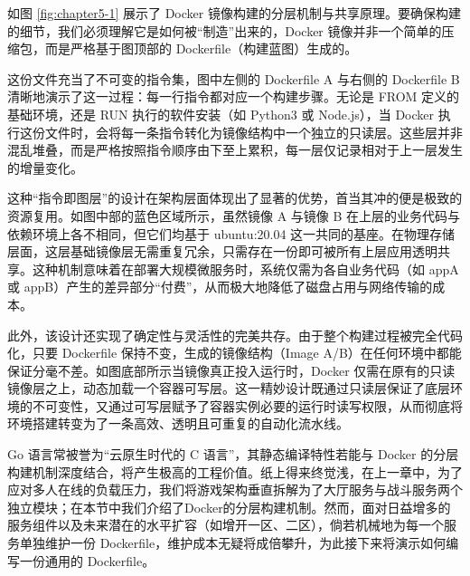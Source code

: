 如图 \ref{fig:chapter5-1} 展示了 Docker 镜像构建的分层机制与共享原理。要确保构建的细节，我们必须理解它是如何被“制造”出来的，Docker 镜像并非一个简单的压缩包，而是严格基于图顶部的 Dockerfile（构建蓝图）生成的。

这份文件充当了不可变的指令集，图中左侧的 Dockerfile A 与右侧的 Dockerfile B 清晰地演示了这一过程：每一行指令都对应一个构建步骤。无论是 FROM 定义的基础环境，还是 RUN 执行的软件安装（如 Python3 或 Node.js），当 Docker 执行这份文件时，会将每一条指令转化为镜像结构中一个独立的只读层。这些层并非混乱堆叠，而是严格按照指令顺序由下至上累积，每一层仅记录相对于上一层发生的增量变化。

这种“指令即图层”的设计在架构层面体现出了显著的优势，首当其冲的便是极致的资源复用。如图中部的蓝色区域所示，虽然镜像 A 与镜像 B 在上层的业务代码与依赖环境上各不相同，但它们均基于 ubuntu:20.04 这一共同的基座。在物理存储层面，这层基础镜像层无需重复冗余，只需存在一份即可被所有上层应用透明共享。这种机制意味着在部署大规模微服务时，系统仅需为各自业务代码（如 appA 或 appB）产生的差异部分“付费”，从而极大地降低了磁盘占用与网络传输的成本。

此外，该设计还实现了确定性与灵活性的完美共存。由于整个构建过程被完全代码化，只要 Dockerfile 保持不变，生成的镜像结构（Image A/B）在任何环境中都能保证分毫不差。如图底部所示当镜像真正投入运行时，Docker 仅需在原有的只读镜像层之上，动态加载一个容器可写层。这一精妙设计既通过只读层保证了底层环境的不可变性，又通过可写层赋予了容器实例必要的运行时读写权限，从而彻底将环境搭建转变为了一条高效、透明且可重复的自动化流水线。

Go 语言常被誉为“云原生时代的 C 语言”，其静态编译特性若能与 Docker 的分层构建机制深度结合，将产生极高的工程价值。纸上得来终觉浅，在上一章中，为了应对多人在线的负载压力，我们将游戏架构垂直拆解为了大厅服务与战斗服务两个独立模块；在本节中我们介绍了Docker的分层构建机制。然而，面对日益增多的服务组件以及未来潜在的水平扩容（如增开一区、二区），倘若机械地为每一个服务单独维护一份 Dockerfile，维护成本无疑将成倍攀升，为此接下来将演示如何编写一份通用的 Dockerfile。


